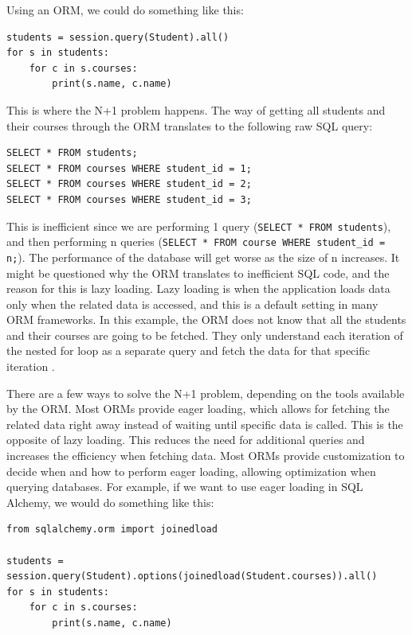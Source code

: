 Using an ORM, we could do something like this:

\begin{verbatim}
students = session.query(Student).all()
for s in students:
    for c in s.courses:
        print(s.name, c.name)
\end{verbatim}

This is where the N+1 problem happens. The way of getting all students and their courses through the ORM translates to the following raw SQL query: 

\begin{verbatim}
SELECT * FROM students;
SELECT * FROM courses WHERE student_id = 1;
SELECT * FROM courses WHERE student_id = 2;
SELECT * FROM courses WHERE student_id = 3;
\end{verbatim}

This is inefficient since we are performing 1 query (\texttt{SELECT * FROM students}),
and then performing n queries (\texttt{SELECT * FROM course WHERE student\_id = n;}).
The performance of the database will get worse as the size of n increases.
It might be questioned why the ORM translates to inefficient SQL code, and the reason for this is lazy loading.
Lazy loading is when the application loads data only when the related data is accessed, and this is a default setting in many ORM frameworks.
In this example, the ORM does not know that all the students and their courses are going to be fetched.
They only understand each iteration of the nested for loop as a separate query and fetch the data for that specific iteration \cite{Jacky_2023}.

There are a few ways to solve the N+1 problem, depending on the tools available by the ORM.
Most ORMs provide eager loading, which allows for fetching the related data right away instead of waiting until specific data is called.
This is the opposite of lazy loading. This reduces the need for additional queries and increases the efficiency when fetching data. Most ORMs
provide customization to decide when and how to perform eager loading, allowing optimization when querying databases.
For example, if we want to use eager loading in SQL Alchemy, we would do something like this:

\begin{verbatim}
from sqlalchemy.orm import joinedload

students = session.query(Student).options(joinedload(Student.courses)).all()
for s in students:
    for c in s.courses:
        print(s.name, c.name)
\end{verbatim}

